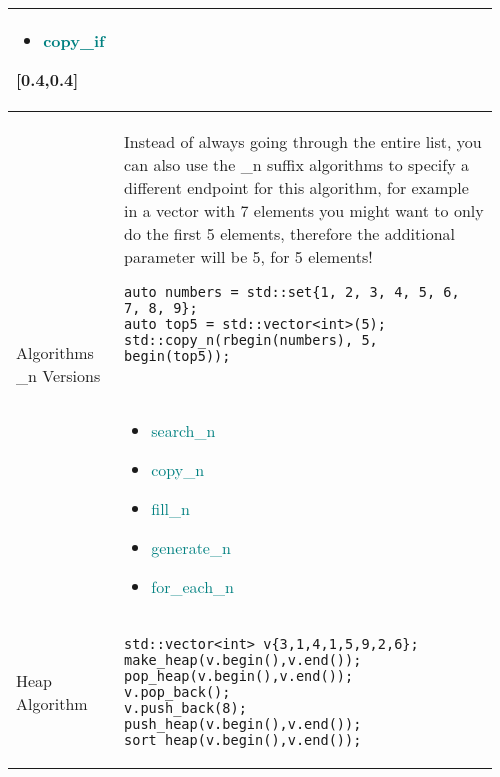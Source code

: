 \documentclass[main.tex,fontsize=8pt,paper=a4,paper=portrait,DIV=calc,]{scrartcl}
\begin{document}
\begin{table}[ht!]
\begin{tabular}{|m{0.2\linewidth}|m{0.755\linewidth}|}
{\begin{itemize}
\item \textcolor{teal}{copy\_if}
\end{itemize} 
}[0.4,0.4]\\
\hline
Algorithms \_n Versions & 
Instead of always going through the entire list, you can also use the \_n suffix algorithms to specify a different endpoint for this algorithm, for example in a vector with 7 elements you might want to only do the first 5 elements, therefore the additional parameter will be 5, for 5 elements!\newline
\begin{lstlisting}
auto numbers = std::set{1, 2, 3, 4, 5, 6, 7, 8, 9};
auto top5 = std::vector<int>(5);
std::copy_n(rbegin(numbers), 5, begin(top5));
\end{lstlisting}
\, \newline
\begin{itemize}
\item \textcolor{teal}{search\_n}
\item \textcolor{teal}{copy\_n}
\item \textcolor{teal}{fill\_n}
\item \textcolor{teal}{generate\_n}
\item \textcolor{teal}{for\_each\_n}
\vspace{-3mm}
\end{itemize}\\ 
\hline
Heap Algorithm & 
\begin{lstlisting}
std::vector<int> v{3,1,4,1,5,9,2,6};
make_heap(v.begin(),v.end());
pop_heap(v.begin(),v.end());
v.pop_back();
v.push_back(8);
push_heap(v.begin(),v.end());
sort_heap(v.begin(),v.end());
\end{lstlisting}\\
\hline
\end{tabular}
\end{table}
\pagebreak
\end{document}
